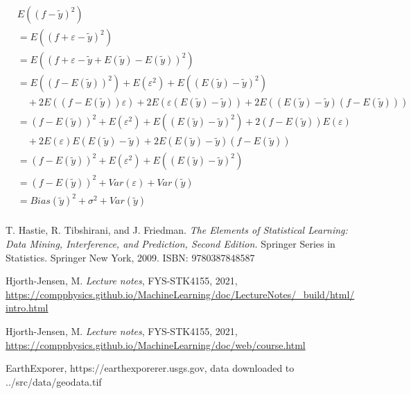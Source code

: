 \documentclass[12pt]{article}
\begin{document}
\begin{align*}
 & E\left((f - \tilde{y})^2\right) \\
 &   = E\left((f+\varepsilon - \tilde{y} )^2\right) \\
 &   = E\left((f+\varepsilon - \tilde{y} +E(\tilde{y})-E(\tilde{y}))^2\right) \\
 &   = E\left((f-E(\tilde{y}))^2\right)+E(\varepsilon^2)+E\left((E(\tilde{y})- \tilde{y})^2\right) \\
 &   \quad  +2E\left((f-E(\tilde{y}))\varepsilon\right)
+2E\left(\varepsilon(E(\tilde{y})- \tilde{y})\right)
+2E\left((E(\tilde{y})- \tilde{y})(f-E(\tilde{y}))\right) \\
 &   = (f-E(\tilde{y}))^2+E(\varepsilon^2)+E\left((E(\tilde{y})- \tilde{y})^2\right) 
+2(f-E(\tilde{y}))E(\varepsilon) \\
 &   \quad +2E(\varepsilon)E\left(E(\tilde{y})- \tilde{y}\right)
 +2E\left(E(\tilde{y})- \tilde{y}\right)(f-E(\tilde{y})) \\
 &   = (f-E(\tilde{y}))^2+E(\varepsilon^2)+E\left((E(\tilde{y})- \tilde{y})^2\right)\\
 &   = (f-E(\tilde{y}))^2+Var(\varepsilon)+Var\left(\tilde{y}\right)\\
 &   = Bias(\tilde{y})^2+\sigma^2+Var\left(\tilde{y}\right)\\
\end{align*}

\begin{thebibliography}{9}
T. Hastie, R. Tibshirani, and J. Friedman.
\emph{The Elements of Statistical Learning: Data Mining, Interference, and Prediction, Second Edition.} Springer Series in Statistics. Springer New York, 2009. ISBN: 9780387848587

Hjorth-Jensen, M. \emph{Lecture notes}, FYS-STK4155, 2021, \url{https://compphysics.github.io/MachineLearning/doc/LectureNotes/_build/html/intro.html}

Hjorth-Jensen, M. \emph{Lecture notes}, FYS-STK4155, 2021, \url{https://compphysics.github.io/MachineLearning/doc/web/course.html}

EarthExporer, https://earthexporerer.usgs.gov, data downloaded to ../src/data/geodata.tif

\end{thebibliography}
\end{document}
